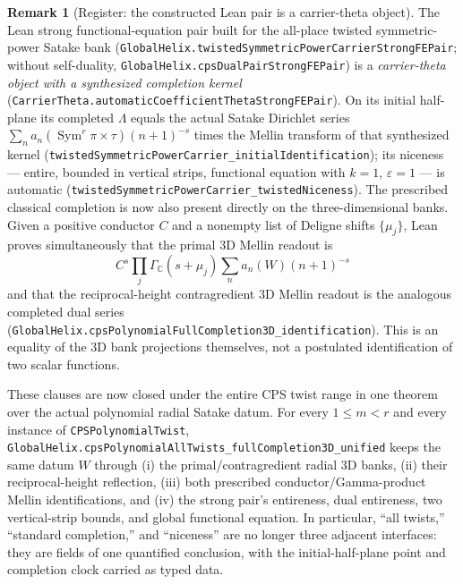 \documentclass[11pt]{article}
\theoremstyle{definition}
\newtheorem{remark}[theorem]{Remark}
\newcommand{\Sym}{\operatorname{Sym}}
\begin{document}
\begin{remark}[Register: the constructed Lean pair is a carrier-theta object]\label{rem:cps-carrier-register}
The Lean strong functional-equation pair built for the all-place twisted symmetric-power Satake bank
(\texttt{GlobalHelix.twistedSymmetricPowerCarrierStrongFEPair}; without self-duality,
\texttt{GlobalHelix.cpsDualPairStrongFEPair}) is a \emph{carrier-theta object with a synthesized
completion kernel} (\texttt{CarrierTheta.automaticCoefficientThetaStrongFEPair}). On its initial
half-plane its completed $\Lambda$ equals the actual Satake Dirichlet series
$\sum_n a_n(\Sym^r\pi\times\tau)(n+1)^{-s}$ times the Mellin transform of that synthesized kernel
(\texttt{twistedSymmetricPowerCarrier\_initialIdentification}); its niceness --- entire, bounded in
vertical strips, functional equation with $k=1$, $\varepsilon=1$ --- is automatic
(\texttt{twistedSymmetricPowerCarrier\_twistedNiceness}).  The prescribed classical completion is
now also present directly on the three-dimensional banks.  Given a positive conductor $C$ and a
nonempty list of Deligne shifts $\{\mu_j\}$, Lean proves simultaneously that the primal 3D Mellin
readout is
\[
 C^s\prod_j\Gamma_{\mathbb C}(s+\mu_j)
   \sum_n a_n(W)(n+1)^{-s}
\]
and that the reciprocal-height contragredient 3D Mellin readout is the analogous completed dual
series (\texttt{GlobalHelix.cpsPolynomialFullCompletion3D\_identification}).  This is an equality of
the 3D bank projections themselves, not a postulated identification of two scalar functions.

These clauses are now closed under the entire CPS twist range in one theorem over the actual
polynomial radial Satake datum.  For every $1\leq m<r$ and every instance of
\texttt{CPSPolynomialTwist},
\texttt{GlobalHelix.cpsPolynomialAllTwists\_fullCompletion3D\_unified} keeps the same datum $W$
through (i) the primal/contragredient radial 3D banks, (ii) their reciprocal-height reflection,
(iii) both prescribed conductor/Gamma-product Mellin identifications, and (iv) the strong pair's
entireness, dual entireness, two vertical-strip bounds, and global functional equation.  In
particular, ``all twists,'' ``standard completion,'' and ``niceness'' are no longer three adjacent
interfaces: they are fields of one quantified conclusion, with the initial-half-plane point and
completion clock carried as typed data.


\end{remark}
\end{document}
